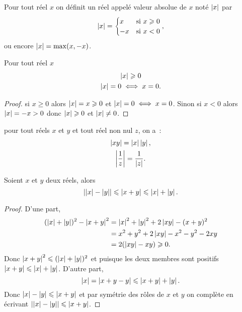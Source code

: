 \begin{defdef}
  Pour tout réel \(x\) on définit un réel appelé valeur absolue de \(x\) noté 
  \(\left\lvert x\right\rvert\) par
  \begin{equation}
    \left\lvert x\right\rvert=\begin{cases} x & \text{si } x\geqslant 0 \\ -x & \text{si } 
    x<0\end{cases},
    \end{equation}
    ou encore \(\left\lvert x\right\rvert=\max(x,-x)\).
  \end{defdef}
  \begin{prop}
    Pour tout réel \(x\)
    \begin{gather}
      \left\lvert x\right\rvert\geqslant 0 \\
      \left\lvert x\right\rvert=0 \iff x=0.
    \end{gather}
  \end{prop}
  \begin{proof}
    si \(x\geqslant 0\) alors \(\left\lvert x\right\rvert=x\geqslant 0\) et \(\left\lvert x\right\rvert=0 \iff 
    x=0\). Sinon si \(x<0\) alors \(\left\lvert x\right\rvert=-x>0\) donc \(\left\lvert x\right\rvert\geqslant 0\) 
    et \(\left\lvert x\right\rvert\neq 0\).
  \end{proof}
  \begin{prop}
    pour tout réels \(x\) et \(y\) et tout réel non nul \(z\), on a~:
    \begin{gather}
      \left\lvert xy\right\rvert=\left\lvert x\right\rvert\left\lvert y\right\rvert, \\ \left\lvert\frac{1}{z}\right\rvert=\frac{1}{\left\lvert z\right\rvert}.
    \end{gather}
  \end{prop}
  \begin{prop}
    Soient \(x\) et \(y\) deux réels, alors
    \begin{equation}
      \left\lvert\left\lvert x\right\rvert-\left\lvert y\right\rvert\right\rvert\leqslant \left\lvert x+y\right\rvert \leqslant \left\lvert x\right\rvert+\left\lvert y\right\rvert.
    \end{equation}
  \end{prop}
  \begin{proof}
    D'une part,
    \begin{align}
      (\left\lvert x\right\rvert+\left\lvert y\right\rvert)^2-\left\lvert x+y\right\rvert^2 &=\left\lvert x\right\rvert^2+\left\lvert y\right\rvert^2+2\left\lvert xy\right\rvert-(x+y)^2\\
                                      &=x^2+y^2+2\left\lvert xy\right\rvert-x^2-y^2-2xy\\
                                      &=2(\left\lvert xy\right\rvert-xy)\geqslant 0.
    \end{align}
    Donc \(\left\lvert x+y\right\rvert^2\leqslant (\left\lvert x\right\rvert+\left\lvert y\right\rvert)^2\) et puisque les deux 
    membres sont positifs \(\left\lvert x+y\right\rvert\leqslant \left\lvert x\right\rvert+\left\lvert y\right\rvert\). D'autre part,
    \begin{equation}
      \left\lvert x\right\rvert=\left\lvert x+y-y\right\rvert\leqslant \left\lvert x+y\right\rvert+\left\lvert y\right\rvert.
    \end{equation}
    Donc \(\left\lvert x\right\rvert-\left\lvert y\right\rvert\leqslant \left\lvert x+y\right\rvert\) et par symétrie des rôles de 
    \(x\) et \(y\) on complète en écrivant \(\left\lvert\left\lvert x\right\rvert-\left\lvert y\right\rvert\right\rvert\leqslant 
    \left\lvert x+y\right\rvert\).
  \end{proof}
